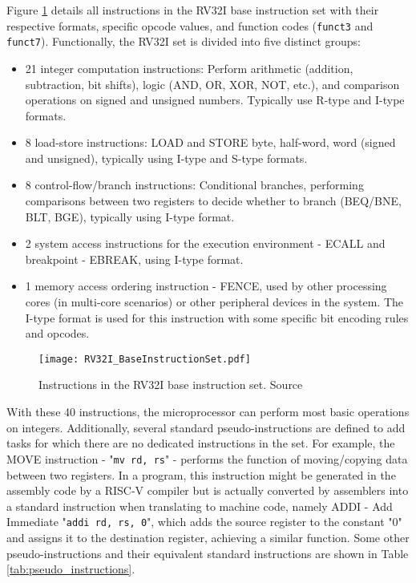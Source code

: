 Figure \ref{fig:rv32i_instructions} details all instructions in the RV32I base instruction set with their respective formats, specific opcode values, and function codes (\texttt{funct3} and \texttt{funct7}). Functionally, the RV32I set is divided into five distinct groups:
\begin{itemize}
    \item 21 integer computation instructions: Perform arithmetic (addition, subtraction, bit shifts), logic (AND, OR, XOR, NOT, etc.), and comparison operations on signed and unsigned numbers. Typically use R-type and I-type formats.
    \item 8 load-store instructions: LOAD and STORE byte, half-word, word (signed and unsigned), typically using I-type and S-type formats.
    \item 8 control-flow/branch instructions: Conditional branches, performing comparisons between two registers to decide whether to branch (BEQ/BNE, BLT, BGE), typically using I-type format.
    \item 2 system access instructions for the execution environment - ECALL and breakpoint - EBREAK, using I-type format.
    \item 1 memory access ordering instruction - FENCE, used by other processing cores (in multi-core scenarios) or other peripheral devices in the system. The I-type format is used for this instruction with some specific bit encoding rules and opcodes.
\end{itemize}

\begin{figure}[htbp!]
    \centering
    \texttt{[image: RV32I\_BaseInstructionSet.pdf]}
    \caption{Instructions in the RV32I base instruction set. Source \cite{riscv:manual:user:2024}}
    \label{fig:rv32i_instructions}
\end{figure}

With these 40 instructions, the microprocessor can perform most basic operations on integers. Additionally, several standard pseudo-instructions are defined to add tasks for which there are no dedicated instructions in the set. For example, the MOVE instruction - "\texttt{mv rd, rs}" - performs the function of moving/copying data between two registers. In a program, this instruction might be generated in the assembly code by a RISC-V compiler but is actually converted by assemblers into a standard instruction when translating to machine code, namely ADDI - Add Immediate "\texttt{addi rd, rs, 0}", which adds the source register to the constant "0" and assigns it to the destination register, achieving a similar function. Some other pseudo-instructions and their equivalent standard instructions are shown in Table \ref{tab:pseudo_instructions}.

